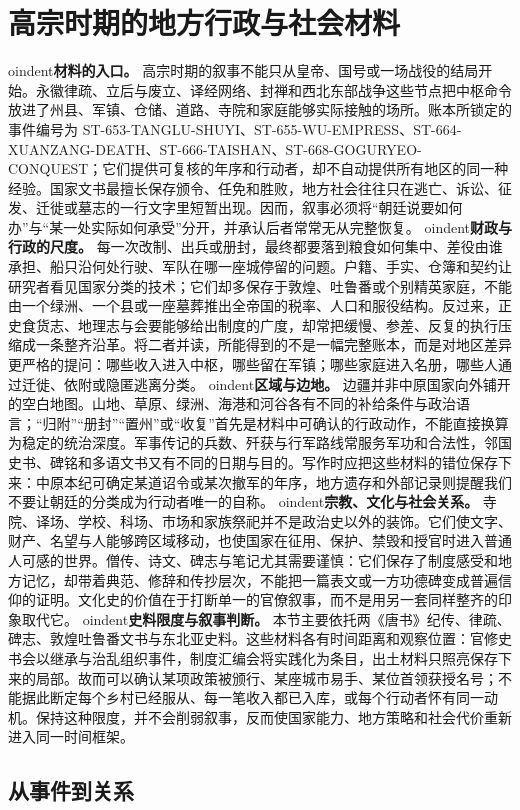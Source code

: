 \section{高宗时期的地方行政与社会材料} \label{sec:gao-zong-regional-administration}  oindent\textbf{材料的入口。} 高宗时期的叙事不能只从皇帝、国号或一场战役的结局开始。永徽律疏、立后与废立、译经网络、封禅和西北东部战争这些节点把中枢命令放进了州县、军镇、仓储、道路、寺院和家庭能够实际接触的场所。账本所锁定的事件编号为 ST-653-TANGLU-SHUYI、ST-655-WU-EMPRESS、ST-664-XUANZANG-DEATH、ST-666-TAISHAN、ST-668-GOGURYEO-CONQUEST；它们提供可复核的年序和行动者，却不自动提供所有地区的同一种经验。国家文书最擅长保存颁令、任免和胜败，地方社会往往只在逃亡、诉讼、征发、迁徙或墓志的一行文字里短暂出现。因而，叙事必须将“朝廷说要如何办”与“某一处实际如何承受”分开，并承认后者常常无从完整恢复。   oindent\textbf{财政与行政的尺度。} 每一次改制、出兵或册封，最终都要落到粮食如何集中、差役由谁承担、船只沿何处行驶、军队在哪一座城停留的问题。户籍、手实、仓簿和契约让研究者看见国家分类的技术；它们却多保存于敦煌、吐鲁番或个别精英家庭，不能由一个绿洲、一个县或一座墓葬推出全帝国的税率、人口和服役结构。反过来，正史食货志、地理志与会要能够给出制度的广度，却常把缓慢、参差、反复的执行压缩成一条整齐沿革。将二者并读，所能得到的不是一幅完整账本，而是对地区差异更严格的提问：哪些收入进入中枢，哪些留在军镇；哪些家庭进入名册，哪些人通过迁徙、依附或隐匿逃离分类。   oindent\textbf{区域与边地。} 边疆并非中原国家向外铺开的空白地图。山地、草原、绿洲、海港和河谷各有不同的补给条件与政治语言；“归附”“册封”“置州”或“收复”首先是材料中可确认的行政动作，不能直接换算为稳定的统治深度。军事传记的兵数、歼获与行军路线常服务军功和合法性，邻国史书、碑铭和多语文书又有不同的日期与目的。写作时应把这些材料的错位保存下来：中原本纪可确定某道诏令或某次撤军的年序，地方遗存和外部记录则提醒我们不要让朝廷的分类成为行动者唯一的自称。   oindent\textbf{宗教、文化与社会关系。} 寺院、译场、学校、科场、市场和家族祭祀并不是政治史以外的装饰。它们使文字、财产、名望与人能够跨区域移动，也使国家在征用、保护、禁毁和授官时进入普通人可感的世界。僧传、诗文、碑志与笔记尤其需要谨慎：它们保存了制度感受和地方记忆，却带着典范、修辞和传抄层次，不能把一篇表文或一方功德碑变成普遍信仰的证明。文化史的价值在于打断单一的官僚叙事，而不是用另一套同样整齐的印象取代它。   oindent\textbf{史料限度与叙事判断。} 本节主要依托两《唐书》纪传、律疏、碑志、敦煌吐鲁番文书与东北亚史料。这些材料各有时间距离和观察位置：官修史书会以继承与治乱组织事件，制度汇编会将实践化为条目，出土材料只照亮保存下来的局部。故而可以确认某项政策被颁行、某座城市易手、某位首领获授名号；不能据此断定每个乡村已经服从、每一笔收入都已入库，或每个行动者怀有同一动机。保持这种限度，并不会削弱叙事，反而使国家能力、地方策略和社会代价重新进入同一时间框架。  \subsection{从事件到关系} 